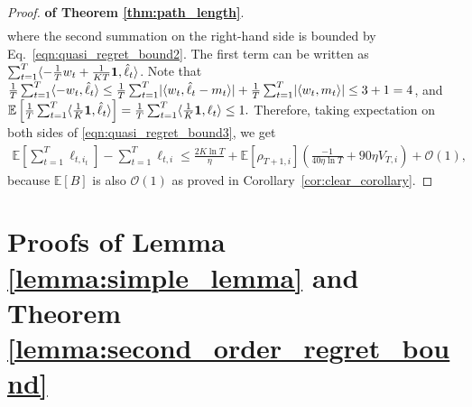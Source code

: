 \begin{proof}{\textbf{of Theorem \ref{thm:path_length}}.}
\begin{align}
\end{align}
where the second summation on the right-hand side is bounded by Eq.~\eqref{eqn:quasi_regret_bound2}.
The first term can be written as $\sum_{t=1}^T \langle {-\frac{1}{T}w_t+\frac{1}{KT}\mathbf{1}, \hat{\ell}_t} \rangle$. Note that$
\frac{1}{T}\sum_{t=1}^T\langle {-w_t, \hat{\ell}_t} \rangle\leq \frac{1}{T}\sum_{t=1}^T\lvert { \langle {w_t,\hat{\ell}_t-m_t} \rangle } \rvert+\frac{1}{T}\sum_{t=1}^T\lvert { \langle {w_t, m_t} \rangle } \rvert \leq 3 + 1=4$, and
$
\mathbb{E}\left[\frac{1}{T}\sum_{t=1}^T \langle {\frac{1}{K}\mathbf{1},\hat{\ell}_{t}} \rangle\right]=\frac{1}{T}\sum_{t=1}^T \langle {\frac{1}{K}\mathbf{1},\ell_t} \rangle\leq 1. $
Therefore, taking expectation on both sides of \eqref{eqn:quasi_regret_bound3}, we get 
\begin{align*}
\mathbb{E}\left[\sum_{t=1}^T \ell_{t,i_t} \right] - \sum_{t=1}^T \ell_{t,i} \leq \frac{2K\ln T}{\eta} + \mathbb{E}[\rho_{T+1,i}]\left( \frac{-1}{40\eta\ln T} +90\eta V_{T,i} \right) + \mathcal{O}(1),   
\end{align*}
because $\mathbb{E}[B]$ is also $\mathcal{O}(1)$ as proved in Corollary~\ref{cor:clear_corollary}. 
\end{proof}

\section{Proofs of Lemma \ref{lemma:simple_lemma} and Theorem \ref{lemma:second_order_regret_bound}}

